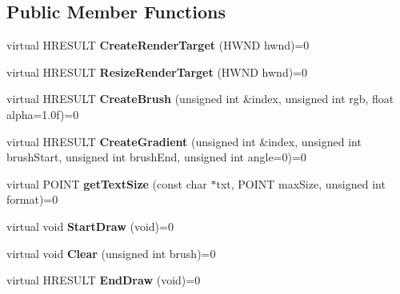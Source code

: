 \subsection*{Public Member Functions}
\begin{DoxyCompactItemize}
\item 
\hypertarget{class_engine_render_a7b313144b67f23c97c1cf51912a56dc2}{virtual H\-R\-E\-S\-U\-L\-T {\bfseries Create\-Render\-Target} (H\-W\-N\-D hwnd)=0}\label{class_engine_render_a7b313144b67f23c97c1cf51912a56dc2}

\item 
\hypertarget{class_engine_render_abfb244fa8d5b2122d2b25b1dbef01020}{virtual H\-R\-E\-S\-U\-L\-T {\bfseries Resize\-Render\-Target} (H\-W\-N\-D hwnd)=0}\label{class_engine_render_abfb244fa8d5b2122d2b25b1dbef01020}

\item 
\hypertarget{class_engine_render_a6d381cafbf7934b4ffda51fdab4f0948}{virtual H\-R\-E\-S\-U\-L\-T {\bfseries Create\-Brush} (unsigned int \&index, unsigned int rgb, float alpha=1.\-0f)=0}\label{class_engine_render_a6d381cafbf7934b4ffda51fdab4f0948}

\item 
\hypertarget{class_engine_render_a55603101b883df3bfac84c54bd28bee4}{virtual H\-R\-E\-S\-U\-L\-T {\bfseries Create\-Gradient} (unsigned int \&index, unsigned int brush\-Start, unsigned int brush\-End, unsigned int angle=0)=0}\label{class_engine_render_a55603101b883df3bfac84c54bd28bee4}

\item 
\hypertarget{class_engine_render_a3d602eef3f305a65226fdbbda35d3a7d}{virtual P\-O\-I\-N\-T {\bfseries get\-Text\-Size} (const char $\ast$txt, P\-O\-I\-N\-T max\-Size, unsigned int format)=0}\label{class_engine_render_a3d602eef3f305a65226fdbbda35d3a7d}

\item 
\hypertarget{class_engine_render_a071a2b1f8ba2bc150c4e343d4c692b22}{virtual void {\bfseries Start\-Draw} (void)=0}\label{class_engine_render_a071a2b1f8ba2bc150c4e343d4c692b22}

\item 
\hypertarget{class_engine_render_ab79ea5186b14eaba38f62b440da15804}{virtual void {\bfseries Clear} (unsigned int brush)=0}\label{class_engine_render_ab79ea5186b14eaba38f62b440da15804}

\item 
\hypertarget{class_engine_render_ae925f3dc0627d4015ab1ae37e15d6db0}{virtual H\-R\-E\-S\-U\-L\-T {\bfseries End\-Draw} (void)=0}\label{class_engine_render_ae925f3dc0627d4015ab1ae37e15d6db0}


\end{DoxyCompactItemize}
